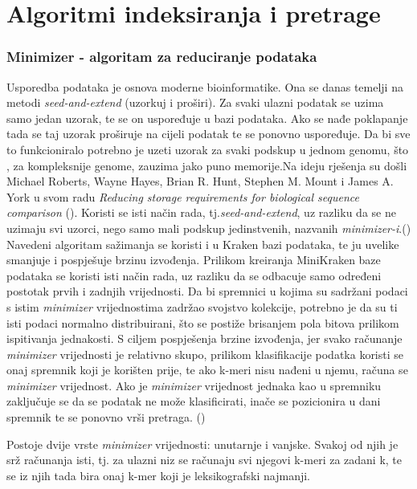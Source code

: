 \documentclass[times, utf8, zavrsni]{fer}
\begin{document}
\chapter{Algoritmi indeksiranja i pretrage}
\subsection{Minimizer - algoritam za reduciranje podataka}
Usporedba podataka je osnova moderne bioinformatike. Ona se danas temelji na metodi \textit{seed-and-extend} (uzorkuj i proširi). Za svaki ulazni podatak se uzima samo jedan uzorak, te se on uspoređuje u bazi podataka. Ako se nađe poklapanje tada se taj uzorak proširuje na cijeli podatak te se ponovno uspoređuje. Da bi sve to funkcioniralo potrebno je uzeti uzorak za svaki podskup u jednom genomu, što , za kompleksnije genome, zauzima jako puno memorije.Na ideju rješenja su došli Michael Roberts, Wayne Hayes, Brian R. Hunt, Stephen M. Mount i James A. York u svom radu \textit{Reducing storage requirements for biological sequence comparison} (\cite{minim}). Koristi se isti način rada, tj.\textit{seed-and-extend}, uz razliku da se ne uzimaju svi uzorci, nego samo mali podskup jedinstvenih, nazvanih \textit{minimizer-i}.(\cite{minim})
\\ Navedeni algoritam sažimanja se koristi i u Kraken bazi podataka, te ju uvelike smanjuje i pospješuje brzinu izvođenja. Prilikom kreiranja MiniKraken baze podataka se koristi isti način rada, uz razliku da se odbacuje samo određeni postotak prvih i zadnjih vrijednosti. Da bi spremnici u kojima su sadržani podaci s istim \textit{minimizer} vrijednostima zadržao svojstvo kolekcije, potrebno je da su ti isti podaci normalno distribuirani, što se postiže brisanjem pola bitova prilikom ispitivanja jednakosti. S ciljem pospješenja brzine izvođenja, jer svako računanje \textit{minimizer} vrijednosti je relativno skupo, prilikom klasifikacije podatka koristi se onaj spremnik koji je korišten prije, te ako k-meri nisu nađeni u njemu, računa se \textit{minimizer} vrijednost. Ako je \textit{minimizer} vrijednost jednaka kao u spremniku zaključuje se da se podatak ne može klasificirati, inače se pozicionira u dani spremnik te se ponovno vrši pretraga. (\cite{Kraken})

Postoje dvije vrste \textit{minimizer} vrijednosti: unutarnje i vanjske. Svakoj od njih je srž računanja isti, tj. za ulazni niz se računaju svi njegovi k-meri za zadani k, te se iz njih tada bira onaj k-mer koji je leksikografski najmanji. 
\end{document}

